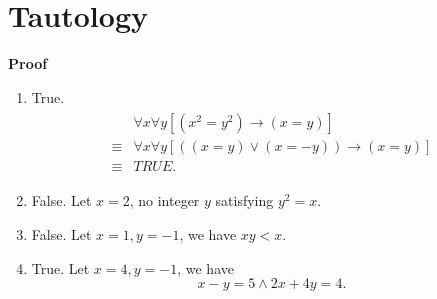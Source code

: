 \documentclass{../../cls/sig-alternate-05-2015}
\begin{document}
\section{Tautology}
\textbf{Proof}\begin{enumerate}[label=(\alph*)]
	\item True. \begin{align}
		\begin{aligned}
		& \forall x \forall y [(x^2 = y^2) \rightarrow (x = y)]\\
		\equiv & \forall x \forall y [((x = y) \lor (x = -y)) \rightarrow (x = y)]\\
		\equiv & TRUE.
		\end{aligned}
	\end{align}
	\item False. Let $x = 2$, no integer $y$ satisfying $y^2 = x$.
	\item False. Let $x = 1, y = -1$, we have $xy < x$.
	\item True. Let $x = 4, y = -1$, we have \begin{equation}
		x - y = 5 \land 2x + 4y = 4.
	\end{equation}
\end{enumerate}
\end{document}
